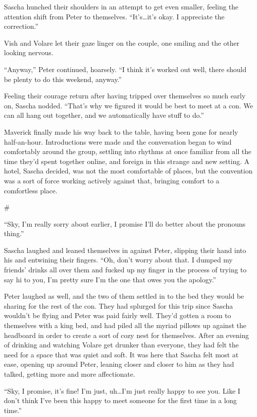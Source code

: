 \documentclass[12pt,letterpaper,oneside]{memoir}
\newcommand\secdiv{
  \begin{center}
    \#
  \end{center}
}
\begin{document}
  Sascha hunched their shoulders in an attempt to get even smaller, feeling the attention shift from Peter to themselves. ``It's\ldots{}it's okay. I appreciate the correction.''

  Vish and Volare let their gaze linger on the couple, one smiling and the other looking nervous.

  ``Anyway,'' Peter continued, hoarsely. ``I think it's worked out well, there should be plenty to do this weekend, anyway.''

  Feeling their courage return after having tripped over themselves so much early on, Sascha nodded. ``That's why we figured it would be best to meet at a con. We can all hang out together, and we automatically have stuff to do.''

  Maverick finally made his way back to the table, having been gone for nearly half-an-hour. Introductions were made and the conversation began to wind comfortably around the group, settling into rhythms at once familiar from all the time they'd spent together online, and foreign in this strange and new setting. A hotel, Sascha decided, was not the most comfortable of places, but the convention was a sort of force working actively against that, bringing comfort to a comfortless place.

  \secdiv

  ``Sky, I'm really sorry about earlier, I promise I'll do better about the pronouns thing.''

  Sascha laughed and leaned themselves in against Peter, slipping their hand into his and entwining their fingers. ``Oh, don't worry about that. I dumped my friends' drinks all over them and fucked up my finger in the process of trying to say hi to you, I'm pretty sure I'm the one that owes you the apology.''

  Peter laughed as well, and the two of them settled in to the bed they would be sharing for the rest of the con. They had splurged for this trip since Sascha wouldn't be flying and Peter was paid fairly well. They'd gotten a room to themselves with a king bed, and had piled all the myriad pillows up against the headboard in order to create a sort of cozy nest for themselves. After an evening of drinking and watching Volare get drunker than everyone, they had felt the need for a space that was quiet and soft. It was here that Sascha felt most at ease, opening up around Peter, leaning closer and closer to him as they had talked, getting more and more affectionate.

  ``Sky, I promise, it's fine! I'm just, uh\ldots{}I'm just really happy to see you. Like I don't think I've been this happy to meet someone for the first time in a long time.''
\end{document}
